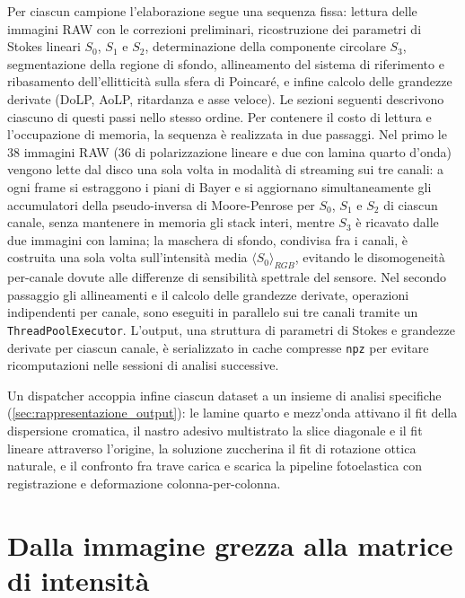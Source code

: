 Per ciascun campione l'elaborazione segue una sequenza fissa: lettura delle immagini RAW con le correzioni preliminari, ricostruzione dei parametri di Stokes lineari $S_0$, $S_1$ e $S_2$, determinazione della componente circolare $S_3$, segmentazione della regione di sfondo, allineamento del sistema di riferimento e ribasamento dell'ellitticità sulla sfera di Poincaré, e infine calcolo delle grandezze derivate (DoLP, AoLP, ritardanza e asse veloce). Le sezioni seguenti descrivono ciascuno di questi passi nello stesso ordine. Per contenere il costo di lettura e l'occupazione di memoria, la sequenza è realizzata in due passaggi. Nel primo le 38 immagini RAW (36 di polarizzazione lineare e due con lamina quarto d'onda) vengono lette dal disco una sola volta in modalità di streaming sui tre canali: a ogni frame si estraggono i piani di Bayer e si aggiornano simultaneamente gli accumulatori della pseudo-inversa di Moore-Penrose per $S_0$, $S_1$ e $S_2$ di ciascun canale, senza mantenere in memoria gli stack interi, mentre $S_3$ è ricavato dalle due immagini con lamina; la maschera di sfondo, condivisa fra i canali, è costruita una sola volta sull'intensità media $\langle S_0 \rangle_{RGB}$, evitando le disomogeneità per-canale dovute alle differenze di sensibilità spettrale del sensore. Nel secondo passaggio gli allineamenti e il calcolo delle grandezze derivate, operazioni indipendenti per canale, sono eseguiti in parallelo sui tre canali tramite un \texttt{ThreadPoolExecutor}. L'output, una struttura di parametri di Stokes e grandezze derivate per ciascun canale, è serializzato in cache compresse \texttt{npz} per evitare ricomputazioni nelle sessioni di analisi successive.

Un dispatcher accoppia infine ciascun dataset a un insieme di analisi specifiche (\cref{sec:rappresentazione_output}): le lamine quarto e mezz'onda attivano il fit della dispersione cromatica, il nastro adesivo multistrato la slice diagonale e il fit lineare attraverso l'origine, la soluzione zuccherina il fit di rotazione ottica naturale, e il confronto fra trave carica e scarica la pipeline fotoelastica con registrazione e deformazione colonna-per-colonna.

\section{Dalla immagine grezza alla matrice di intensità}
\label{sec:preelaborazione}

